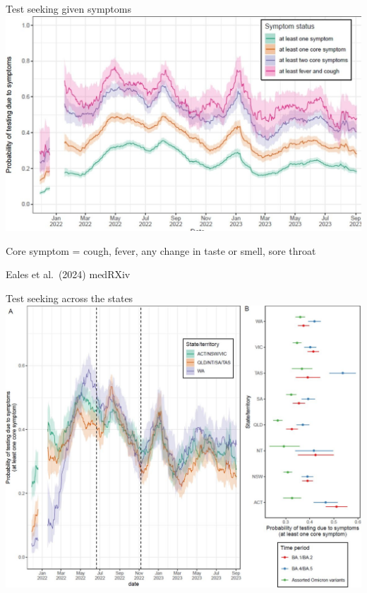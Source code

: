 \documentclass[
  ignorenonframetext,
  aspectratio=149,
]{beamer}
\begin{document}
\begin{frame}{Test seeking given symptoms}
\label{test-seeking-given-symptoms}
\includegraphics{images/eales_F1.large.jpg}

Core symptom = cough, fever, any change in taste or smell, sore throat

Eales et al.~(2024) medRXiv
\end{frame}

\begin{frame}{Test seeking across the states}
\label{test-seeking-across-the-states}
\includegraphics{images/eales_F2.large.jpg}
\end{frame}
\end{document}
